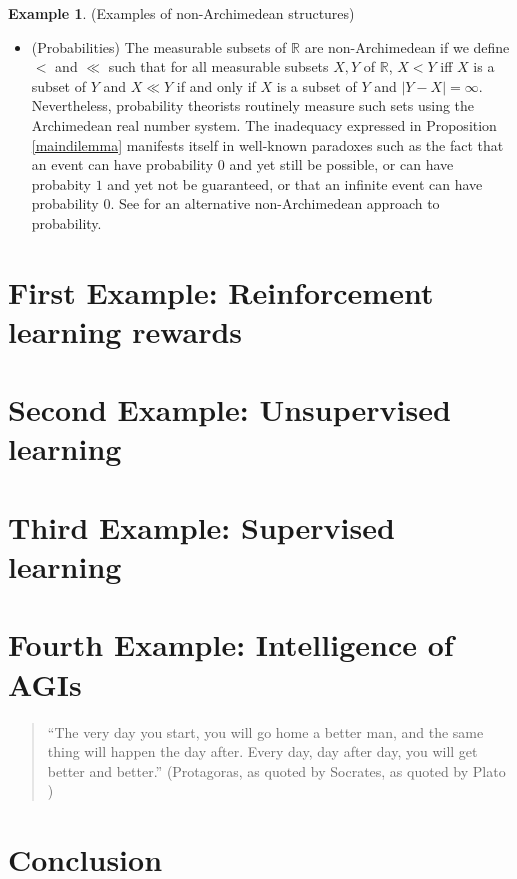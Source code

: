 \documentclass[reqno]{article}
\theoremstyle{definition}
\newtheorem{example}[theorem]{Example}
\begin{document}
\begin{example}
(Examples of non-Archimedean structures)
    \begin{itemize}
        \item
        (Probabilities)
        The measurable subsets of $\mathbb R$ are non-Archimedean
        if we define $<$ and $\ll$ such that for all measurable subsets
        $X,Y$ of $\mathbb R$, $X<Y$ iff $X$ is a subset of $Y$
        and $X\ll Y$ if and only if $X$ is a subset of $Y$ and $|Y-X|=\infty$.
        Nevertheless, probability theorists routinely
        measure such sets using the Archimedean real number system.
        The inadequacy expressed in Proposition \ref{maindilemma}
        manifests itself in well-known paradoxes such as the fact that
        an event can have probability $0$ and yet still be possible,
        or can have probabity $1$ and yet not be guaranteed,
        or that an infinite event can have probability $0$.
        See \cite{benci2013non} for an alternative non-Archimedean approach
        to probability.
    \end{itemize}
\end{example}

\section{First Example: Reinforcement learning rewards}

\section{Second Example: Unsupervised learning}

\section{Third Example: Supervised learning}

\section{Fourth Example: Intelligence of AGIs}

\begin{quote}
    ``The very day you start, you will go home a better man,
    and the same thing will happen the day after. Every day,
    day after day, you will get better and better.''
    (Protagoras, as quoted by Socrates, as quoted by Plato \cite{protagoras})
\end{quote}

\section{Conclusion}



\end{document}
